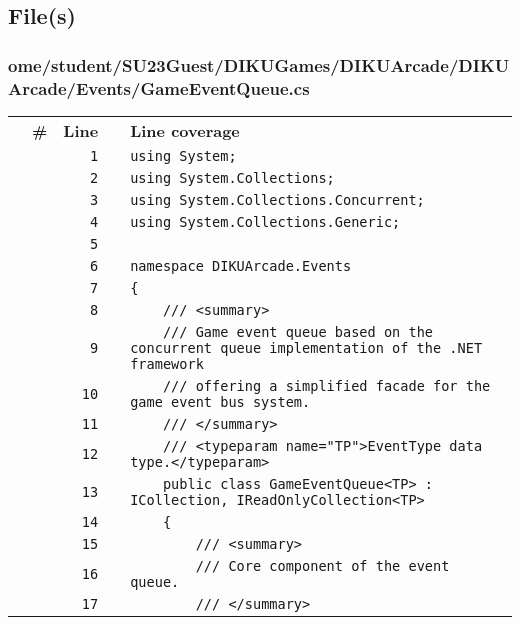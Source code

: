 \documentclass[a4paper,landscape,10pt]{article}
\begin{document}
\subsection{File(s)}
\subsubsection{ome/student/SU23Guest/DIKUGames/DIKUArcade/DIKUArcade/Events/GameEventQueue.cs}
\begin{longtable}[l]{lrrll}
\textbf{} & \textbf{\#} & \textbf{Line} & \textbf{} & \textbf{Line coverage}\\
\cellcolor{gray} &  & \verb~1~ & & \verb~using System;~\\
\cellcolor{gray} &  & \verb~2~ & & \verb~using System.Collections;~\\
\cellcolor{gray} &  & \verb~3~ & & \verb~using System.Collections.Concurrent;~\\
\cellcolor{gray} &  & \verb~4~ & & \verb~using System.Collections.Generic;~\\
\cellcolor{gray} &  & \verb~5~ & & \verb~~\\
\cellcolor{gray} &  & \verb~6~ & & \verb~namespace DIKUArcade.Events~\\
\cellcolor{gray} &  & \verb~7~ & & \verb~{~\\
\cellcolor{gray} &  & \verb~8~ & & \verb~    /// <summary>~\\
\cellcolor{gray} &  & \verb~9~ & & \verb~    /// Game event queue based on the concurrent queue implementation of the .NET framework~\\
\cellcolor{gray} &  & \verb~10~ & & \verb~    /// offering a simplified facade for the game event bus system.~\\
\cellcolor{gray} &  & \verb~11~ & & \verb~    /// </summary>~\\
\cellcolor{gray} &  & \verb~12~ & & \verb~    /// <typeparam name="TP">EventType data type.</typeparam>~\\
\cellcolor{gray} &  & \verb~13~ & & \verb~    public class GameEventQueue<TP> : ICollection, IReadOnlyCollection<TP>~\\
\cellcolor{gray} &  & \verb~14~ & & \verb~    {~\\
\cellcolor{gray} &  & \verb~15~ & & \verb~        /// <summary>~\\
\cellcolor{gray} &  & \verb~16~ & & \verb~        /// Core component of the event queue.~\\
\cellcolor{gray} &  & \verb~17~ & & \verb~        /// </summary>~\\

\end{longtable}
\end{document}
